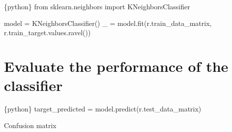 \documentclass[
  letterpaper,
  DIV=11,
  numbers=noendperiod,
  oneside]{scrreprt}
\newenvironment{Shaded}{\begin{snugshade}}{\end{snugshade}}
\newcommand{\AttributeTok}[1]{\textcolor[rgb]{0.40,0.45,0.13}{#1}}
\newcommand{\CommentTok}[1]{\textcolor[rgb]{0.37,0.37,0.37}{#1}}
\newcommand{\DecValTok}[1]{\textcolor[rgb]{0.68,0.00,0.00}{#1}}
\newcommand{\FunctionTok}[1]{\textcolor[rgb]{0.28,0.35,0.67}{#1}}
\newcommand{\ImportTok}[1]{\textcolor[rgb]{0.00,0.46,0.62}{#1}}
\newcommand{\InformationTok}[1]{\textcolor[rgb]{0.37,0.37,0.37}{#1}}
\newcommand{\NormalTok}[1]{\textcolor[rgb]{0.00,0.23,0.31}{#1}}
\newcommand{\OperatorTok}[1]{\textcolor[rgb]{0.37,0.37,0.37}{#1}}
\newcommand{\OtherTok}[1]{\textcolor[rgb]{0.00,0.23,0.31}{#1}}
\newcommand{\SpecialCharTok}[1]{\textcolor[rgb]{0.37,0.37,0.37}{#1}}
\newcommand{\StringTok}[1]{\textcolor[rgb]{0.13,0.47,0.30}{#1}}
\begin{document}
\begin{Shaded}
\begin{Highlighting}[]
\InformationTok{\textasciigrave{}\textasciigrave{}\textasciigrave{}\{python\}}
\ImportTok{from}\NormalTok{ sklearn.neighbors }\ImportTok{import}\NormalTok{ KNeighborsClassifier}

\NormalTok{model }\OperatorTok{=}\NormalTok{ KNeighborsClassifier()}
\NormalTok{\_ }\OperatorTok{=}\NormalTok{ model.fit(r.train\_data\_matrix, r.train\_target.values.ravel())}
\InformationTok{\textasciigrave{}\textasciigrave{}\textasciigrave{}}
\end{Highlighting}
\end{Shaded}

\hypertarget{evaluate-the-performance-of-the-classifier}{%
\section{Evaluate the performance of the
classifier}\label{evaluate-the-performance-of-the-classifier}}

\begin{Shaded}
\begin{Highlighting}[]
\InformationTok{\textasciigrave{}\textasciigrave{}\textasciigrave{}\{python\}}
\NormalTok{target\_predicted }\OperatorTok{=}\NormalTok{ model.predict(r.test\_data\_matrix)}
\InformationTok{\textasciigrave{}\textasciigrave{}\textasciigrave{}}
\end{Highlighting}
\end{Shaded}

Confusion matrix

\begin{Shaded}
\end{Shaded}
\end{document}
